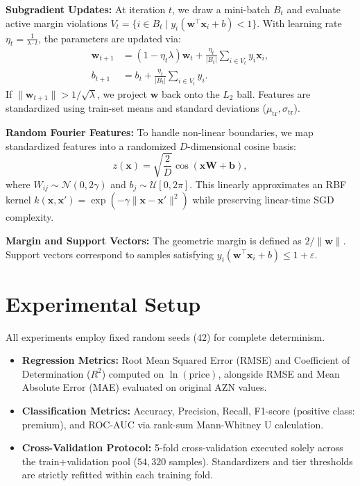 \documentclass[10pt,twocolumn,a4paper]{article}
\begin{document}
\textbf{Subgradient Updates:} At iteration $t$, we draw a mini-batch $B_t$ and evaluate active margin violations $V_t = \{i \in B_t \mid y_i(\mathbf{w}^\top \mathbf{x}_i + b) < 1\}$. With learning rate $\eta_t = \frac{1}{\lambda \cdot t}$, the parameters are updated via:
\begin{align}
  \mathbf{w}_{t+1} &= (1 - \eta_t \lambda)\mathbf{w}_t + \frac{\eta_t}{|B_t|} \sum_{i \in V_t} y_i \mathbf{x}_i, \\
  b_{t+1} &= b_t + \frac{\eta_t}{|B_t|} \sum_{i \in V_t} y_i.
\end{align}
If $\|\mathbf{w}_{t+1}\| > 1/\sqrt{\lambda}$, we project $\mathbf{w}$ back onto the $L_2$ ball. Features are standardized using train-set means and standard deviations ($\mu_{\text{tr}}, \sigma_{\text{tr}}$).

\textbf{Random Fourier Features:} To handle non-linear boundaries, we map standardized features into a randomized $D$-dimensional cosine basis:
\begin{equation}
  z(\mathbf{x}) = \sqrt{\frac{2}{D}} \cos(\mathbf{x} \mathbf{W} + \mathbf{b}),
\end{equation}
where $W_{ij} \sim \mathcal{N}(0, 2\gamma)$ and $b_j \sim \mathcal{U}[0, 2\pi]$. This linearly approximates an RBF kernel $k(\mathbf{x}, \mathbf{x}') = \exp(-\gamma \|\mathbf{x} - \mathbf{x}'\|^2)$ while preserving linear-time SGD complexity.

\textbf{Margin and Support Vectors:} The geometric margin is defined as $2/\|\mathbf{w}\|$. Support vectors correspond to samples satisfying $y_i(\mathbf{w}^\top \mathbf{x}_i + b) \le 1 + \varepsilon$.

\section{Experimental Setup}
All experiments employ fixed random seeds ($42$) for complete determinism.
\begin{itemize}
    \item \textbf{Regression Metrics:} Root Mean Squared Error (RMSE) and Coefficient of Determination ($R^2$) computed on $\ln(\text{price})$, alongside RMSE and Mean Absolute Error (MAE) evaluated on original AZN values.
    \item \textbf{Classification Metrics:} Accuracy, Precision, Recall, F1-score (positive class: premium), and ROC-AUC via rank-sum Mann-Whitney U calculation.
    \item \textbf{Cross-Validation Protocol:} 5-fold cross-validation executed solely across the train+validation pool ($54,320$ samples). Standardizers and tier thresholds are strictly refitted within each training fold.
\end{itemize}
\end{document}
